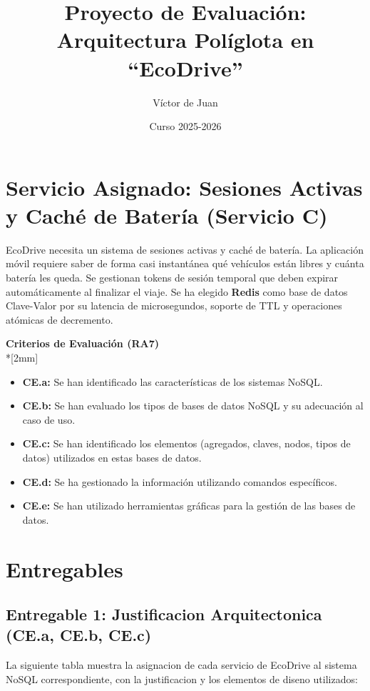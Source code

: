 \documentclass[12pt,a4paper]{article}
\title{\textbf{Proyecto de Evaluación: Arquitectura Políglota en \enquote{EcoDrive}}}
\author{Víctor de Juan}
\date{Curso 2025-2026}
\newenvironment{criterio}{%
  \begin{lrbox}{\mybox}%
  \begin{minipage}{\dimexpr\linewidth-2\fboxsep-2\fboxrule\relax}%
  \textbf{\large Criterios de Evaluaci\'on (RA7)}\\*[2mm]%
}{%
  \end{minipage}\end{lrbox}%
  \colorbox{accentlight}{\fcolorbox{accentframe}{accentlight}{\usebox{\mybox}}}%
  \vspace{2mm}%
}
\begin{document}
\maketitle

\section{Servicio Asignado: Sesiones Activas y Caché de Bater\'ia (Servicio C)}

EcoDrive necesita un sistema de sesiones activas y caché de bater\'ia. La aplicaci\'on m\'ovil requiere saber de forma casi instant\'anea qu\'e veh\'iculos est\'an libres y cu\'anta bater\'ia les queda. Se gestionan tokens de sesi\'on temporal que deben expirar autom\'aticamente al finalizar el viaje. Se ha elegido \textbf{Redis} como base de datos Clave-Valor por su latencia de microsegundos, soporte de TTL y operaciones at\'omicas de decremento.

\begin{criterio}
\begin{itemize}
    \item \textbf{CE.a:} Se han identificado las caracter\'isticas de los sistemas NoSQL.
    \item \textbf{CE.b:} Se han evaluado los tipos de bases de datos NoSQL y su adecuaci\'on al caso de uso.
    \item \textbf{CE.c:} Se han identificado los elementos (agregados, claves, nodos, tipos de datos) utilizados en estas bases de datos.
    \item \textbf{CE.d:} Se ha gestionado la informaci\'on utilizando comandos espec\'ificos.
    \item \textbf{CE.e:} Se han utilizado herramientas gr\'aficas para la gesti\'on de las bases de datos.
\end{itemize}
\end{criterio}

\newpage

\section{Entregables}

\subsection{Entregable 1: Justificacion Arquitectonica (CE.a, CE.b, CE.c)}

La siguiente tabla muestra la asignacion de cada servicio de EcoDrive al sistema NoSQL correspondiente, con la justificacion y los elementos de diseno utilizados:
\end{document}
